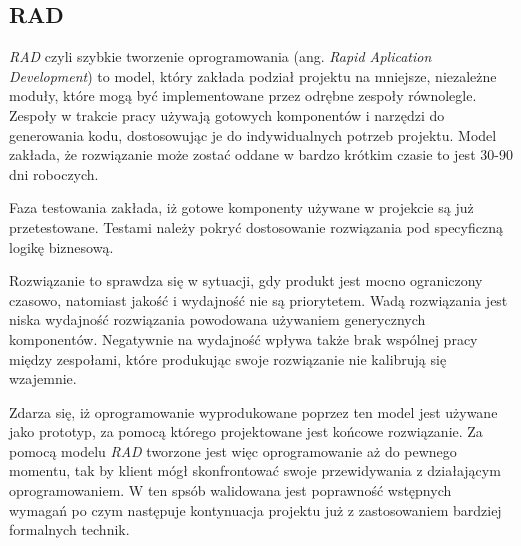 \subsection{RAD}
\textit{RAD} czyli szybkie tworzenie oprogramowania (ang. \textit{Rapid Aplication Development}) to model, który zakłada podział projektu na mniejsze, niezależne moduły, które mogą być implementowane przez odrębne zespoły równolegle. Zespoły w trakcie pracy używają gotowych komponentów i narzędzi do generowania kodu, dostosowując je do indywidualnych potrzeb projektu. Model zakłada, że rozwiązanie może zostać oddane w bardzo krótkim czasie to jest 30-90 dni roboczych.

Faza testowania zakłada, iż gotowe komponenty używane w projekcie są już przetestowane. Testami należy pokryć dostosowanie rozwiązania pod specyficzną logikę biznesową. 

Rozwiązanie to sprawdza się w sytuacji, gdy produkt jest mocno ograniczony czasowo, natomiast jakość i wydajność nie są priorytetem. Wadą rozwiązania jest niska wydajność rozwiązania powodowana używaniem generycznych komponentów. Negatywnie na wydajność wpływa także brak wspólnej pracy między zespołami, które produkując swoje rozwiązanie nie kalibrują się wzajemnie.

Zdarza się, iż oprogramowanie wyprodukowane poprzez ten model jest używane jako prototyp, za pomocą którego projektowane jest końcowe rozwiązanie. Za pomocą modelu \textit{RAD} tworzone jest więc oprogramowanie aż do pewnego momentu, tak by klient mógł skonfrontować swoje przewidywania z działającym oprogramowaniem. W ten spsób walidowana jest poprawność wstępnych wymagań po czym następuje kontynuacja projektu już z zastosowaniem bardziej formalnych technik.
